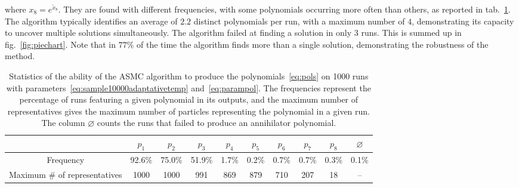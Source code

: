 \documentclass[11pt,a4paper]{article}
\begin{document}
	where $x_{8} = e^{\tilde{x}_{8}}$. They are found with different frequencies, with some polynomials occurring more often than others, as reported in tab.~\ref{table:results}. The algorithm typically identifies an average of $2.2$ distinct polynomials per run, with a maximum number of $4$, demonstrating its capacity to uncover multiple solutions simultaneously. The algorithm failed at finding a solution in only 3 runs. This is summed up in fig.~\ref{fig:piechart}. Note that in $77\%$ of the time the algorithm finds more than a single solution, demonstrating the robustness of the method.

	\begin{table}
		\centering
		\renewcommand{\arraystretch}{1.3}
		\begin{tabular}{c|ccccccccc}
			& $p_{1}$ & $p_{2}$ & $p_{3}$ & $p_{4}$ & $p_{5}$ & $p_{6}$ & $p_{7}$  & $p_{8}$&  $\varnothing$  \\\hline\hline
			Frequency & 92.6\% & 75.0\% & 51.9\% & 1.7\% & 0.2\% & 0.7\% & 0.7\% & 0.3\% & 0.1\% \\
			Maximum \# of representatives & 1000 & 1000 & 991 & 869 & 879 & 710 & 207 & 18 & --
		\end{tabular}
		\caption{Statistics of the ability of the ASMC algorithm to produce the polynomials~\eqref{eq:pols} on 1000 runs with parameters~\eqref{eq:sample10000adaptativetemp} and~\eqref{eq:parampol}. The frequencies represent the percentage of runs featuring a given polynomial in its outputs, and the maximum number of representatives gives the maximum number of particles representing the polynomial in a given run. The column $\varnothing$ counts the runs that failed to produce an annihilator polynomial.}
		\label{table:results}
	\end{table}
\end{document}
